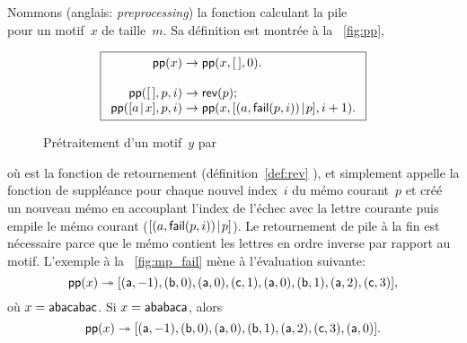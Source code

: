 Nommons  (anglais:
\emph{preprocessing}) la fonction calculant la pile
\begin{equation*}
[\pair{\ind{x}{0}}{\MPfailure{x}{}{0}},
\pair{\ind{x}{1}}{\MPfailure{x}{}{1}}, \dots,
\pair{\ind{x}{m-1}}{\MPfailure{x}{}{m-1}}]
\end{equation*}
pour un motif~\(x\) de taille~\(m\). Sa définition est montrée à la
\fig~\vref{fig:pp},
\begin{figure}[t]
\begin{equation*}
\boxed{%
\begin{array}{r@{\;}l@{\;}l}
\fun{pp}(x) & \rightarrow & \fun{pp}(x,\el,0).\\
\\
\fun{pp}(\el,p,i) & \rightarrow & \fun{rev}(p);\\
\fun{pp}(\cons{a}{x},p,i)
  & \rightarrow
  & \fun{pp}(x,\cons{\pair{a}{\fun{fail}(p,i)}}{p},i+1).
\end{array}}
\end{equation*}
\caption{Prétraitement d'un motif~\(y\) par }
\label{fig:pp}
\end{figure}
où  est la fonction de retournement
(définition~\eqref{def:rev} ), et
 simplement appelle la fonction de
suppléance  pour chaque nouvel index~\(i\) du mémo
courant~\(p\) et créé un nouveau mémo en accouplant l'index de l'échec
avec la lettre courante puis empile le mémo courant
(\([{({a},{\textsf{fail}(p,i)})}\!\mid\!{p}]\)). Le retournement de pile à
la fin est nécessaire parce que le mémo contient les lettres en ordre
inverse par rapport au motif. L'exemple à la \fig~\vref{fig:mp_fail}
mène à l'évaluation suivante:
\begin{equation*}
\textsf{pp}(x) \twoheadrightarrow
[({\textsf{a}},{-1}), ({\textsf{b}},{0}),
({\textsf{a}},{0}), ({\textsf{c}},{1}),
({\textsf{a}},{0}), ({\textsf{b}},{1}),
({\textsf{a}},{2}), ({\textsf{c}},{3})],
\end{equation*}
où \(x=\textsf{abacabac}\). Si \(x=\textsf{ababaca}\), alors
\begin{equation*}
\abovedisplayskip=2pt
\belowdisplayskip=0pt
\fun{pp}(x) \twoheadrightarrow
[\pair{\word{a}}{-1}, \pair{\word{b}}{0},
\pair{\word{a}}{0}, \pair{\word{b}}{1},
\pair{\word{a}}{2}, \pair{\word{c}}{3},
\pair{\word{a}}{0}].
\end{equation*}

